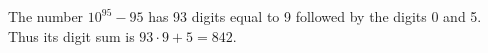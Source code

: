 The number $10^{95}-95$ has 93 digits equal to 9 followed by the digits 0 and 5. Thus its digit sum is $93\cdot9+5=\boxed{842}$.
